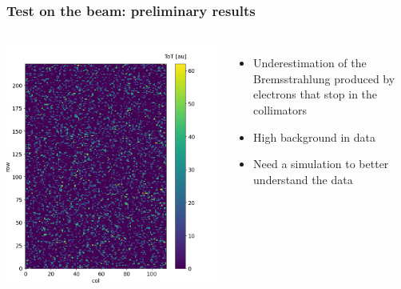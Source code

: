     \begin{frame}
        \frametitle{Test on the beam: preliminary results}
        \begin{columns}
                \includegraphics[width=1.1\linewidth]{figures/test_beam/tot_mapq1_15-57.png}  
                \begin{itemize}
                    \item Underestimation of the Bremsstrahlung produced by electrons that stop in the collimators 
                    \item High background in data
                    \item Need a simulation to better understand the data
                \end{itemize}
            \end{columns}
        \end{frame}  


